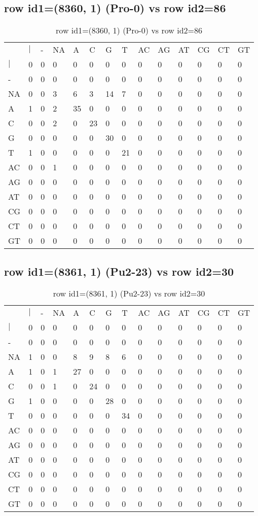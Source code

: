 \subsection{row id1=(8360, 1) (Pro-0) vs row id2=86}
\begin{center}
\begin{longtable}{|l|l|l|l|l|l|l|l|l|l|l|l|l|l|}
\caption{row id1=(8360, 1) (Pro-0) vs row id2=86} \label{table_dm586}\\
\hline
\\
\hline
&$|$&-&NA&A&C&G&T&AC&AG&AT&CG&CT&GT\\
$|$&0&0&0&0&0&0&0&0&0&0&0&0&0\\
-&0&0&0&0&0&0&0&0&0&0&0&0&0\\
NA&0&0&3&6&3&14&7&0&0&0&0&0&0\\
A&1&0&2&35&0&0&0&0&0&0&0&0&0\\
C&0&0&2&0&23&0&0&0&0&0&0&0&0\\
G&0&0&0&0&0&30&0&0&0&0&0&0&0\\
T&1&0&0&0&0&0&21&0&0&0&0&0&0\\
AC&0&0&1&0&0&0&0&0&0&0&0&0&0\\
AG&0&0&0&0&0&0&0&0&0&0&0&0&0\\
AT&0&0&0&0&0&0&0&0&0&0&0&0&0\\
CG&0&0&0&0&0&0&0&0&0&0&0&0&0\\
CT&0&0&0&0&0&0&0&0&0&0&0&0&0\\
GT&0&0&0&0&0&0&0&0&0&0&0&0&0\\
\hline
\end{longtable}
\end{center}

\subsection{row id1=(8361, 1) (Pu2-23) vs row id2=30}
\begin{center}
\begin{longtable}{|l|l|l|l|l|l|l|l|l|l|l|l|l|l|}
\caption{row id1=(8361, 1) (Pu2-23) vs row id2=30} \label{table_dm588}\\
\hline
\\
\hline
&$|$&-&NA&A&C&G&T&AC&AG&AT&CG&CT&GT\\
$|$&0&0&0&0&0&0&0&0&0&0&0&0&0\\
-&0&0&0&0&0&0&0&0&0&0&0&0&0\\
NA&1&0&0&8&9&8&6&0&0&0&0&0&0\\
A&1&0&1&27&0&0&0&0&0&0&0&0&0\\
C&0&0&1&0&24&0&0&0&0&0&0&0&0\\
G&1&0&0&0&0&28&0&0&0&0&0&0&0\\
T&0&0&0&0&0&0&34&0&0&0&0&0&0\\
AC&0&0&0&0&0&0&0&0&0&0&0&0&0\\
AG&0&0&0&0&0&0&0&0&0&0&0&0&0\\
AT&0&0&0&0&0&0&0&0&0&0&0&0&0\\
CG&0&0&0&0&0&0&0&0&0&0&0&0&0\\
CT&0&0&0&0&0&0&0&0&0&0&0&0&0\\
GT&0&0&0&0&0&0&0&0&0&0&0&0&0\\
\hline
\end{longtable}
\end{center}

